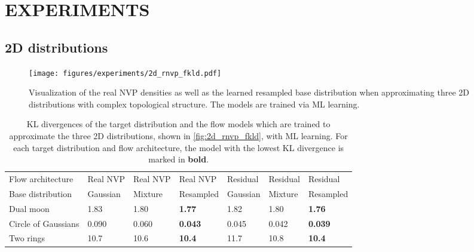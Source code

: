 \documentclass[twoside]{article}
\begin{document}
\section{EXPERIMENTS}

\subsection{2D distributions}
\label{sec:exp_2d}

\begin{figure*}[h]
    \centering
    \texttt{[image: figures/experiments/2d\_rnvp\_fkld.pdf]}
    \caption{Visualization of the real NVP densities as well as the learned resampled base distribution when approximating three 2D distributions with complex topological structure. The models are trained via ML learning.}
    \label{fig:2d_rnvp_fkld}
\end{figure*}

\begin{table*}[h!]
  \caption{KL divergences of the target distribution and the flow models which are trained to approximate the three 2D distributions, shown in \autoref{fig:2d_rnvp_fkld}, with ML learning. For each target distribution and flow architecture, the model with the lowest KL divergence is marked in \textbf{bold}.}
  \label{tab:2d_fkld_kld}
  \centering
  \vspace{0.3cm}
  \begin{tabular}{l|lll|lll}
    Flow architecture & Real NVP & Real NVP & Real NVP & Residual & Residual & Residual \\
    Base distribution & Gaussian & Mixture & Resampled & Gaussian & Mixture & Resampled \\
    \hline 
    Dual moon & 1.83 & 1.80 & \textbf{1.77} & 1.82 & 1.80 & \textbf{1.76} \\
    Circle of Gaussians & 0.090 & 0.060 & \textbf{0.043} & 0.045 & 0.042 & \textbf{0.039} \\
    Two rings & 10.7 & 10.6 & \textbf{10.4} & 11.7 & 10.8 & \textbf{10.4}
  \end{tabular}
\end{table*}
\end{document}
